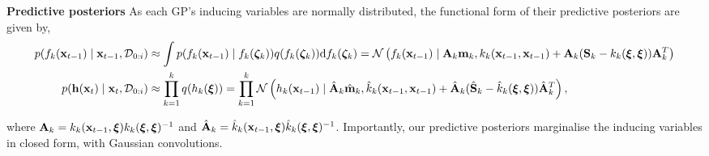 \documentclass[twoside]{article}
\newcommand{\numData}{\ensuremath{t}}
\newcommand{\modeInd}{\ensuremath{k}}
\newcommand{\ModeInd}{\ensuremath{\MakeUppercase{\modeInd}}}
\newcommand{\mode}[1]{\ensuremath{#1_{\modeInd}}}
\newcommand{\state}{\ensuremath{\mathbf{x}}}
\newcommand{\x}{\ensuremath{\mathbf{x}}}
\newcommand{\dataset}{\ensuremath{\mathcal{D}}}
\newcommand{\singleInput}{\ensuremath{\x_{\numData-1}}}
\newcommand{\gatingFunc}{\ensuremath{h}}
\newcommand{\GatingFunc}{\ensuremath{\mathbf{\gatingFunc}}}
\newcommand{\latentFunc}{\ensuremath{f}}
\begin{document}
\textbf{Predictive posteriors}
As each GP's inducing variables are normally distributed, the functional form of their predictive posteriors are given by,
\begin{align}
\label{eq--variational-posteriors-functional-experts}
p(\mode{\latentFunc}(\singleInput) \mid \singleInput, \dataset_{0:i})
&\approx \int p(\mode{\latentFunc}(\singleInput) \mid \mode{\latentFunc}(\expertInducingInput))
q(\mode{\latentFunc}(\expertInducingInput)) \text{d} \mode{\latentFunc}(\expertInducingInput)
= \mathcal{N} \left( \mode{\latentFunc}(\singleInput) \mid
\mode{\mathbf{A}} \mode{\mathbf{m}},
\expertKernelnn
+ \mode{\mathbf{A}}
(\mode{\mathbf{S}} - \expertKernelMM)
\mode{\mathbf{A}}^T
\right) \\
p(\GatingFunc(\state_{\timeInd}) \mid \state_{\timeInd}, \dataset_{0:i})
&\approx \prod_{\modeInd=1}^\ModeInd q(\mode{\gatingFunc}(\gatingInducingInput))
= \prod_{\modeInd=1}^\ModeInd \mathcal{N} \left( \mode{\gatingFunc}(\singleInput) \mid
\mode{\hat{\mathbf{A}}} \mode{\hat{\mathbf{m}}},
\gatingKernelnn
+ \mode{\hat{\mathbf{A}}}
(\mode{\hat{\mathbf{S}}} - \gatingKernelMM)
\mode{\hat{\mathbf{A}}}^T
\right), \label{eq--variational-posteriors-functional-gating}
\end{align}

where
\(\mode{\mathbf{A}} = \expertKernelnM \expertKernelMM^{-1}\) and
\(\mode{\hat{\mathbf{A}}} = \gatingKernelnM \gatingKernelMM^{-1}\).
Importantly, our predictive posteriors marginalise the inducing variables in closed form, with Gaussian convolutions.
\end{document}

